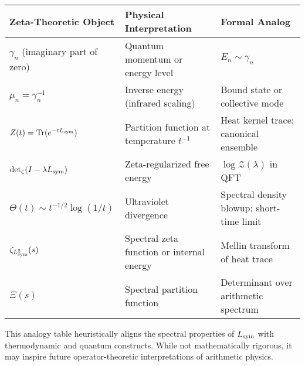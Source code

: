 \begin{center}
\small
\renewcommand{\arraystretch}{1.3}
\begin{tabularx}{\textwidth}{|>{\raggedright\arraybackslash}X
                        |>{\raggedright\arraybackslash}X
                        |>{\raggedright\arraybackslash}X|}
\hline
\textbf{Zeta-Theoretic Object} & \textbf{Physical Interpretation} & \textbf{Formal Analog} \\
\hline
\( \gamma_n \) (imaginary part of zero) &
Quantum momentum or energy level &
\( E_n \sim \gamma_n \) \\

\( \mu_n = \gamma_n^{-1} \) &
Inverse energy (infrared scaling) &
Bound state or collective mode \\

\( Z(t) = \operatorname{Tr}(e^{-t L_{\mathrm{sym}}}) \) &
Partition function at temperature \( t^{-1} \) &
Heat kernel trace; canonical ensemble \\

\( \det\nolimits_{\zeta}(I - \lambda L_{\mathrm{sym}}) \) &
Zeta-regularized free energy &
\( \log \mathcal{Z}(\lambda) \) in QFT \\

\( \Theta(t) \sim t^{-1/2} \log(1/t) \) &
Ultraviolet divergence &
Spectral density blowup; short-time limit \\

\( \zeta_{L_{\mathrm{sym}}^2}(s) \) &
Spectral zeta function or internal energy &
Mellin transform of heat trace \\

\( \Xi(s) \) &
Spectral partition function &
Determinant over arithmetic spectrum \\
\hline
\end{tabularx}
\end{center}

\medskip
\noindent
This analogy table heuristically aligns the spectral properties of \( L_{\mathrm{sym}} \) with thermodynamic and quantum constructs. While not mathematically rigorous, it may inspire future operator-theoretic interpretations of arithmetic physics.
